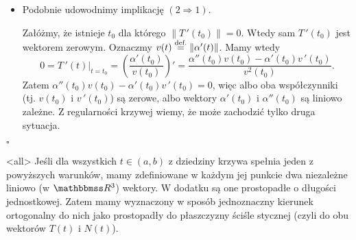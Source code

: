 \begin{frame}


%
\begin{itemize}
\item Podobnie udowodnimy implikację $(2\Rightarrow 1)$.

\pause Załóżmy, że istnieje $t_0$ dla którego $\|T\,'\!(t_0)\|=0$. Wtedy sam $T\,'\!(t_0)$ jest wektorem zerowym. Oznaczmy $v(t)\define\|\alpha'(t)\|$. \pause Mamy wtedy
\[0=T\,'(t)\big|_{t=t_0}=\left(\!\frac{\alpha'(t_0)}{v(t_0)}\!\right)'=
\frac{\alpha''(t_0)v(t_0)-\alpha'(t_0)v\,'(t_0)}{v^2(t_0)}.\]
\pause Zatem $\alpha''(t_0)v(t_0)-\alpha'(t_0)v\,'(t_0)=0$, więc albo oba współczynniki (tj. $v(t_0)$ i $v\,'(t_0)$) są zerowe, albo wektory $\alpha'(t_0)$ i $\alpha''(t_0)$ są liniowo zależne. \pause Z regularności krzywej wiemy, że może zachodzić tylko druga sytuacja.
\end{itemize}
\hfill $\square$
\end{frame}
\mode<all>{}
Jeśli dla wszystkich $t\in (a,b)$ z dziedziny krzywa spełnia jeden z powyższych warunków, mamy zdefiniowane w każdym jej punkcie dwa niezależne liniowo (w $\R^3$) wektory. W dodatku są one prostopadłe o długości jednostkowej. Zatem mamy wyznaczony w sposób jednoznaczny kierunek ortogonalny do nich jako prostopadły do płaszczyzny ściśle stycznej (czyli do obu wektorów $T(t)$ i $N(t)$).

